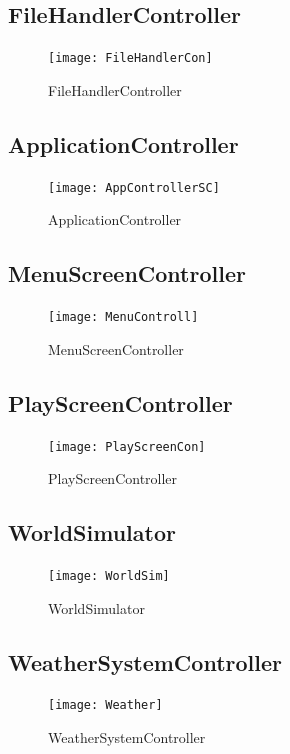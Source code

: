 \documentclass[]{article}
\begin{document}
\subsection{FileHandlerController}
\label{sub:overview}
\begin{figure}[H]
    \centering
    \texttt{[image: FileHandlerCon]}
    \caption{FileHandlerController}
    \label{fig:FileHandlerCon}
\end{figure}

\subsection{ApplicationController}
\label{sub:overview}
\begin{figure}[H]
    \centering
    \texttt{[image: AppControllerSC]}
    \caption{ApplicationController}
    \label{fig:AppControllerSC}
\end{figure}

\subsection{MenuScreenController}
\label{sub:overview}
\begin{figure}[H]
    \centering
    \texttt{[image: MenuControll]}
    \caption{MenuScreenController}
    \label{fig:MenuControll}
\end{figure}

\subsection{PlayScreenController}
\label{sub:overview}
\begin{figure}[H]
    \centering
    \texttt{[image: PlayScreenCon]}
    \caption{PlayScreenController}
    \label{fig:PlayScreenCon}
\end{figure}

\subsection{WorldSimulator}
\label{sub:overview}
\begin{figure}[H]
    \centering
    \texttt{[image: WorldSim]}
    \caption{WorldSimulator}
    \label{fig:WorldSim}
\end{figure}

\subsection{WeatherSystemController}
\label{sub:overview}
\begin{figure}[H]
    \centering
    \texttt{[image: Weather]}
    \caption{WeatherSystemController}
    \label{fig:Weather}
\end{figure}
\end{document}

